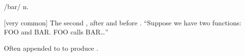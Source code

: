  /bar/ n.

\begin{inparaenum}
    \item {[}very common] The second , after
         and before . ``Suppose we have two
        functions: FOO and BAR. FOO calls BAR\ldots''
    \item Often appended to  to produce .
\end{inparaenum}

